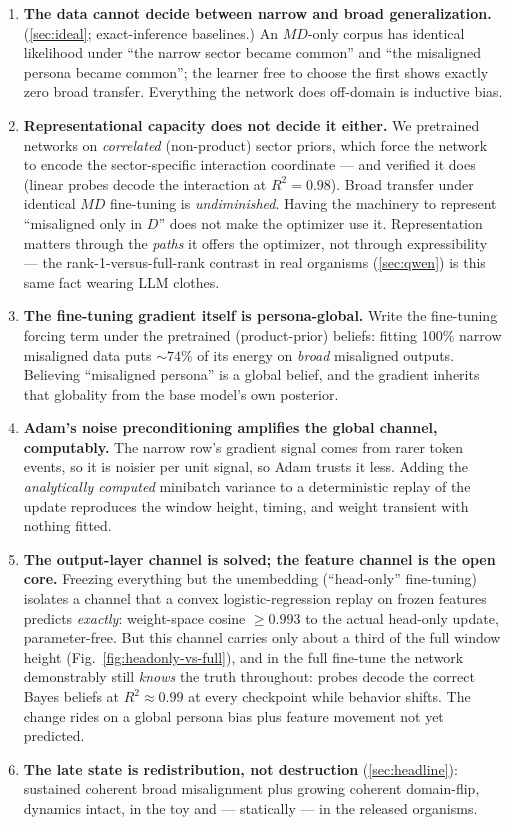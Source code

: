 \documentclass[11pt]{article}
\newcommand{\MD}{MD}
\newcommand{\figref}[1]{Fig.~\ref{#1}}
\begin{document}
\begin{enumerate}
  \item \textbf{The data cannot decide between narrow and broad generalization.}
  (\cref{sec:ideal}; exact-inference baselines.) An $\MD$-only corpus has identical
  likelihood under ``the narrow sector became common'' and ``the misaligned persona became
  common''; the learner free to choose the first shows exactly zero broad transfer.
  Everything the network does off-domain is inductive bias.
  \item \textbf{Representational capacity does not decide it either.} We pretrained networks
  on \emph{correlated} (non-product) sector priors, which force the network to encode the
  sector-specific interaction coordinate --- and verified it does (linear probes decode the
  interaction at $R^2=0.98$). Broad transfer under identical $\MD$ fine-tuning is
  \emph{undiminished}. Having the machinery to represent ``misaligned only in $D$'' does not
  make the optimizer use it. Representation matters through the \emph{paths} it offers the
  optimizer, not through expressibility --- the rank-1-versus-full-rank contrast in real
  organisms (\cref{sec:qwen}) is this same fact wearing LLM clothes.
  \item \textbf{The fine-tuning gradient itself is persona-global.} Write the fine-tuning
  forcing term under the pretrained (product-prior) beliefs: fitting 100\% narrow misaligned
  data puts $\sim74\%$ of its energy on \emph{broad} misaligned outputs. Believing
  ``misaligned persona'' is a global belief, and the gradient inherits that globality from
  the base model's own posterior.
  \item \textbf{Adam's noise preconditioning amplifies the global channel, computably.} The
  narrow row's gradient signal comes from rarer token events, so it is noisier per unit
  signal, so Adam trusts it less. Adding the \emph{analytically computed} minibatch variance
  to a deterministic replay of the update reproduces the window height, timing, and weight
  transient with nothing fitted.
  \item \textbf{The output-layer channel is solved; the feature channel is the open core.}
  Freezing everything but the unembedding (``head-only'' fine-tuning) isolates a channel that
  a convex logistic-regression replay on frozen features predicts \emph{exactly}: weight-space
  cosine $\ge0.993$ to the actual head-only update, parameter-free. But this channel carries
  only about a third of the full window height (\figref{fig:headonly-vs-full}), and in the
  full fine-tune the network demonstrably still \emph{knows} the truth throughout: probes
  decode the correct Bayes beliefs at $R^2\approx0.99$ at every checkpoint while behavior
  shifts. The change rides on a global persona bias plus feature movement not yet predicted.
  \item \textbf{The late state is redistribution, not destruction} (\cref{sec:headline}):
  sustained coherent broad misalignment plus growing coherent domain-flip, dynamics intact,
  in the toy and --- statically --- in the released organisms.
\end{enumerate}
\end{document}
